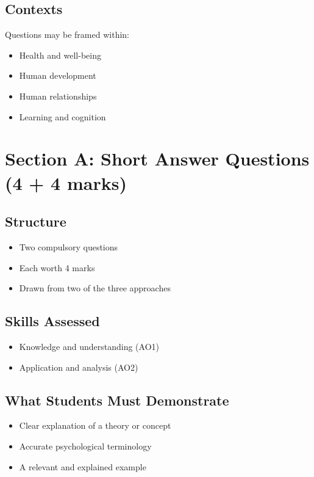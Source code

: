 \documentclass[12pt,a4paper]{article}
\begin{document}
\subsection*{Contexts}
Questions may be framed within:
\begin{itemize}
    \item Health and well-being
    \item Human development
    \item Human relationships
    \item Learning and cognition
\end{itemize}

\newpage

\section{Section A: Short Answer Questions (4 + 4 marks)}

\subsection*{Structure}
\begin{itemize}
    \item Two compulsory questions
    \item Each worth 4 marks
    \item Drawn from two of the three approaches
\end{itemize}

\subsection*{Skills Assessed}
\begin{itemize}
    \item Knowledge and understanding (AO1)
    \item Application and analysis (AO2)
\end{itemize}

\subsection*{What Students Must Demonstrate}
\begin{itemize}
    \item Clear explanation of a theory or concept
    \item Accurate psychological terminology
    \item A relevant and explained example
\end{itemize}
\end{document}
